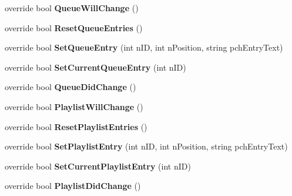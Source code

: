 \begin{DoxyCompactItemize}
override bool {\bfseries Queue\+Will\+Change} ()
\item 
\mbox{\label{class_valve_1_1_steamworks_1_1_c_steam_music_remote_abbe800735adf446705935e6afcf33dcb}} 
override bool {\bfseries Reset\+Queue\+Entries} ()
\item 
\mbox{\label{class_valve_1_1_steamworks_1_1_c_steam_music_remote_aa7de6c5c95c5a2b688249d5b7cd5874e}} 
override bool {\bfseries Set\+Queue\+Entry} (int n\+ID, int n\+Position, string pch\+Entry\+Text)
\item 
\mbox{\label{class_valve_1_1_steamworks_1_1_c_steam_music_remote_a590bb6292737e51f3c29b3df3cf2e785}} 
override bool {\bfseries Set\+Current\+Queue\+Entry} (int n\+ID)
\item 
\mbox{\label{class_valve_1_1_steamworks_1_1_c_steam_music_remote_a04d1adc30b5444507fde1ba56893b0da}} 
override bool {\bfseries Queue\+Did\+Change} ()
\item 
\mbox{\label{class_valve_1_1_steamworks_1_1_c_steam_music_remote_a604ac4630d7ac0a674df8fd87cb463be}} 
override bool {\bfseries Playlist\+Will\+Change} ()
\item 
\mbox{\label{class_valve_1_1_steamworks_1_1_c_steam_music_remote_af45b6bd17b75de3eed505431157dd28f}} 
override bool {\bfseries Reset\+Playlist\+Entries} ()
\item 
\mbox{\label{class_valve_1_1_steamworks_1_1_c_steam_music_remote_a5cf2168613514a41ba5e1eccf28f6bef}} 
override bool {\bfseries Set\+Playlist\+Entry} (int n\+ID, int n\+Position, string pch\+Entry\+Text)
\item 
\mbox{\label{class_valve_1_1_steamworks_1_1_c_steam_music_remote_aaf7b4b050408b226dd672dade3e99f83}} 
override bool {\bfseries Set\+Current\+Playlist\+Entry} (int n\+ID)
\item 
\mbox{\label{class_valve_1_1_steamworks_1_1_c_steam_music_remote_a2cd7c8a0abc11a6b9fc0ace49fb9cf90}} 
override bool {\bfseries Playlist\+Did\+Change} ()
\end{DoxyCompactItemize}


